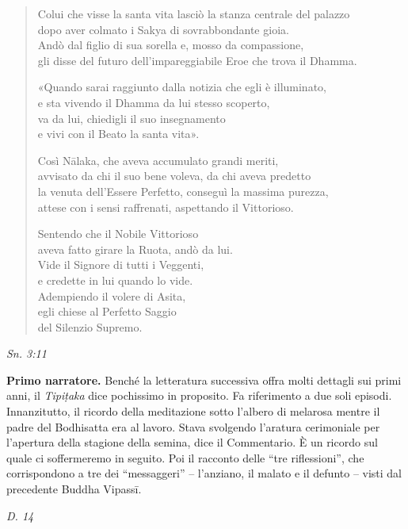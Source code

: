 \begin{quotation}
Colui che visse la santa vita lasciò la stanza centrale del palazzo \\
dopo aver colmato i Sakya di sovrabbondante gioia. \\
Andò dal figlio di sua sorella e, mosso da compassione, \\
gli disse del futuro dell’impareggiabile Eroe che trova il Dhamma.


«Quando sarai raggiunto dalla notizia che egli è illuminato, \\
e sta vivendo il Dhamma da lui stesso scoperto, \\
va da lui, chiedigli il suo insegnamento \\
e vivi con il Beato la santa vita».


Così Nālaka, che aveva accumulato grandi meriti, \\
avvisato da chi il suo bene voleva, da chi aveva predetto \\
la venuta dell’Essere Perfetto, conseguì la massima purezza, \\
attese con i sensi raffrenati, aspettando il Vittorioso.


Sentendo che il Nobile Vittorioso \\
aveva fatto girare la Ruota, andò da lui. \\
Vide il Signore di tutti i Veggenti, \\
e credette in lui quando lo vide. \\
Adempiendo il volere di Asita, \\
egli chiese al Perfetto Saggio \\
del Silenzio Supremo.
\end{quotation}

\emph{Sn. 3:11}


\textbf{Primo narratore.} Benché la letteratura successiva offra molti dettagli
sui primi anni, il \emph{Tipiṭaka} dice pochissimo in proposito. Fa
riferimento a due soli episodi. Innanzitutto, il ricordo della
meditazione sotto l’albero di melarosa mentre il padre del Bodhisatta
era al lavoro. Stava svolgendo l’aratura cerimoniale per l’apertura
della stagione della semina, dice il Commentario. È un ricordo sul quale
ci soffermeremo in seguito. Poi il racconto delle “tre riflessioni”, che
corrispondono a tre dei “messaggeri” – l’anziano, il malato e il defunto
– visti dal precedente Buddha Vipassī.


\emph{D. 14}


